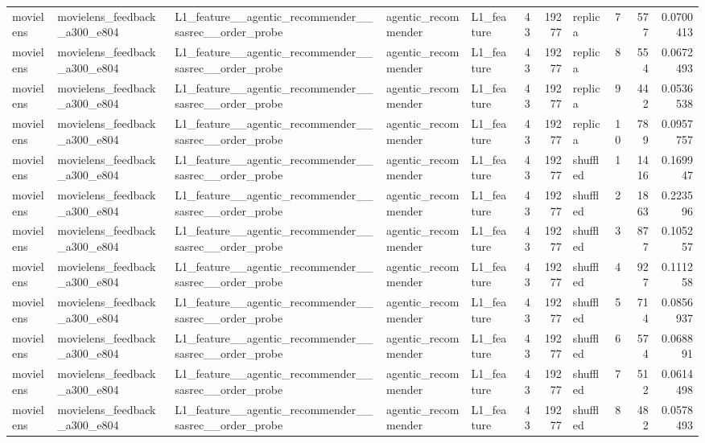 \begin{table}[htbp!]
\begin{tabular}{lllllrrlrrr}
movielens & movielens\_feedback\_a300\_e804 & L1\_feature\_\_agentic\_recommender\_\_sasrec\_\_order\_probe & agentic\_recommender & L1\_feature & 43 & 19277 & replica & 7 & 577 & 0.0700413 \\
movielens & movielens\_feedback\_a300\_e804 & L1\_feature\_\_agentic\_recommender\_\_sasrec\_\_order\_probe & agentic\_recommender & L1\_feature & 43 & 19277 & replica & 8 & 554 & 0.0672493 \\
movielens & movielens\_feedback\_a300\_e804 & L1\_feature\_\_agentic\_recommender\_\_sasrec\_\_order\_probe & agentic\_recommender & L1\_feature & 43 & 19277 & replica & 9 & 442 & 0.0536538 \\
movielens & movielens\_feedback\_a300\_e804 & L1\_feature\_\_agentic\_recommender\_\_sasrec\_\_order\_probe & agentic\_recommender & L1\_feature & 43 & 19277 & replica & 10 & 789 & 0.0957757 \\
movielens & movielens\_feedback\_a300\_e804 & L1\_feature\_\_agentic\_recommender\_\_sasrec\_\_order\_probe & agentic\_recommender & L1\_feature & 43 & 19277 & shuffled & 1 & 1416 & 0.169947 \\
movielens & movielens\_feedback\_a300\_e804 & L1\_feature\_\_agentic\_recommender\_\_sasrec\_\_order\_probe & agentic\_recommender & L1\_feature & 43 & 19277 & shuffled & 2 & 1863 & 0.223596 \\
movielens & movielens\_feedback\_a300\_e804 & L1\_feature\_\_agentic\_recommender\_\_sasrec\_\_order\_probe & agentic\_recommender & L1\_feature & 43 & 19277 & shuffled & 3 & 877 & 0.105257 \\
movielens & movielens\_feedback\_a300\_e804 & L1\_feature\_\_agentic\_recommender\_\_sasrec\_\_order\_probe & agentic\_recommender & L1\_feature & 43 & 19277 & shuffled & 4 & 927 & 0.111258 \\
movielens & movielens\_feedback\_a300\_e804 & L1\_feature\_\_agentic\_recommender\_\_sasrec\_\_order\_probe & agentic\_recommender & L1\_feature & 43 & 19277 & shuffled & 5 & 714 & 0.0856937 \\
movielens & movielens\_feedback\_a300\_e804 & L1\_feature\_\_agentic\_recommender\_\_sasrec\_\_order\_probe & agentic\_recommender & L1\_feature & 43 & 19277 & shuffled & 6 & 574 & 0.068891 \\
movielens & movielens\_feedback\_a300\_e804 & L1\_feature\_\_agentic\_recommender\_\_sasrec\_\_order\_probe & agentic\_recommender & L1\_feature & 43 & 19277 & shuffled & 7 & 512 & 0.0614498 \\
movielens & movielens\_feedback\_a300\_e804 & L1\_feature\_\_agentic\_recommender\_\_sasrec\_\_order\_probe & agentic\_recommender & L1\_feature & 43 & 19277 & shuffled & 8 & 482 & 0.0578493 \\

\end{tabular}
\end{table}
